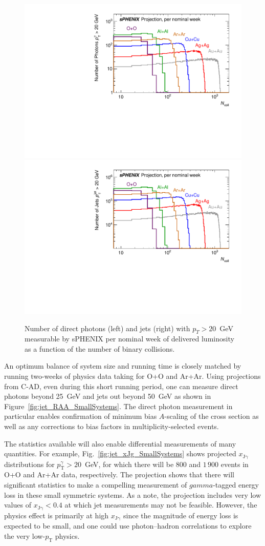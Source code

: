 \begin{figure}[h]
    \centering
    \includegraphics[width=0.48\linewidth]{figs/sPHENIX_BUP_SmallSystems_PhotonProjection}
    \includegraphics[width=0.48\linewidth]{figs/sPHENIX_BUP_SmallSystems_JetProjection}
    \caption{Number of direct photons (left) and jets (right) with $p_T > 20$~GeV measurable by sPHENIX per nominal week of delivered luminosity as a function of the number of binary collisions.}
    \label{fig:figSmallPhoton}
\end{figure}

An optimum balance of system size and running time is closely matched by running two-weeks of physics data taking for O+O and Ar+Ar.   Using projections from C-AD, even during this short running period, one can measure direct photons beyond 25~GeV and jets out beyond 50~GeV as shown in Figure~\ref{fig:jet_RAA_SmallSystems}.   The direct photon measurement in particular enables confirmation of minimum bias $A$-scaling of the cross section as well as any corrections to bias factors in multiplicity-selected events.    

The statistics available will also enable differential measurements of many quantities.  For example, Fig.~\ref{fig:jet_xJg_SmallSystems} shows projected $x_\mathrm{J\gamma}$ distributions for $p_\mathrm{T}^{\gamma} > 20$~GeV, for which there will be $800$ and $1\,900$ events in O+O and Ar+Ar data, respectively. The projection shows that there will significant statistics to make a compelling measurement of $gamma$-tagged energy loss in these small symmetric systems. As a note, the projection includes very low values of $x_\mathrm{J\gamma} < 0.4$ at which jet measurements may not be feasible. However, the physics effect is primarily at high $x_\mathrm{J\gamma}$ since the magnitude of energy loss is expected to be small, and one could use photon--hadron correlations to explore the very low-$p_\mathrm{T}$ physics.


